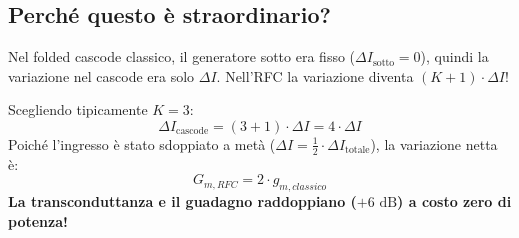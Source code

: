 \documentclass[11pt,a4paper]{article}
\begin{document}
\subsection*{Perché questo è straordinario?}
Nel folded cascode classico, il generatore sotto era fisso ($\Delta I_{\text{sotto}} = 0$), quindi la variazione nel cascode era solo $\Delta I$.  
Nell'RFC la variazione diventa $(K+1) \cdot \Delta I$!

Scegliendo tipicamente \textbf{$K = 3$}:
$$\Delta I_{\text{cascode}} = (3 + 1) \cdot \Delta I = 4 \cdot \Delta I$$
Poiché l'ingresso è stato sdoppiato a metà ($\Delta I = \frac{1}{2} \cdot \Delta I_{\text{totale}}$), la variazione netta è:
$$G_{m,RFC} = 2 \cdot g_{m,classico}$$
\textbf{La transconduttanza e il guadagno raddoppiano ($+6\text{ dB}$) a costo zero di potenza!}
\end{document}
